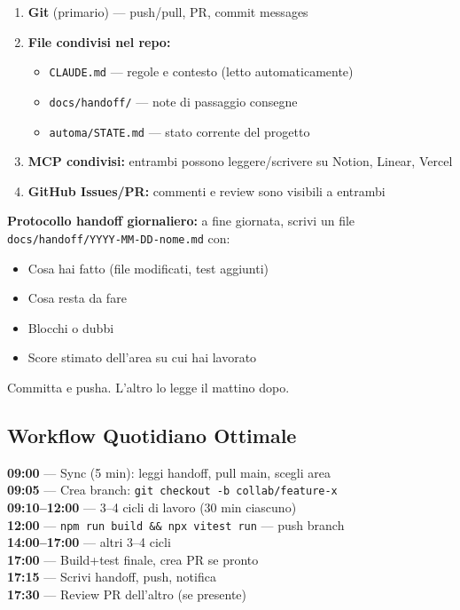 \documentclass[11pt,a4paper]{article}
\begin{document}
\begin{enumerate}[leftmargin=2em]
  \item \textbf{Git} (primario) --- push/pull, PR, commit messages
  \item \textbf{File condivisi nel repo:}
  \begin{itemize}
    \item \texttt{CLAUDE.md} --- regole e contesto (letto automaticamente)
    \item \texttt{docs/handoff/} --- note di passaggio consegne
    \item \texttt{automa/STATE.md} --- stato corrente del progetto
  \end{itemize}
  \item \textbf{MCP condivisi:} entrambi possono leggere/scrivere su Notion, Linear, Vercel
  \item \textbf{GitHub Issues/PR:} commenti e review sono visibili a entrambi
\end{enumerate}

\begin{consiglio}
\textbf{Protocollo handoff giornaliero:} a fine giornata, scrivi un file \texttt{docs/handoff/YYYY-MM-DD-nome.md} con:
\begin{itemize}[leftmargin=1.5em]
  \item Cosa hai fatto (file modificati, test aggiunti)
  \item Cosa resta da fare
  \item Blocchi o dubbi
  \item Score stimato dell'area su cui hai lavorato
\end{itemize}
Committa e pusha. L'altro lo legge il mattino dopo.
\end{consiglio}

\subsection{Workflow Quotidiano Ottimale}

\begin{tecnico}
\textbf{09:00} --- Sync (5 min): leggi handoff, pull main, scegli area\\
\textbf{09:05} --- Crea branch: \texttt{git checkout -b collab/feature-x}\\
\textbf{09:10--12:00} --- 3--4 cicli di lavoro (30 min ciascuno)\\
\textbf{12:00} --- \texttt{npm run build \&\& npx vitest run} --- push branch\\
\textbf{14:00--17:00} --- altri 3--4 cicli\\
\textbf{17:00} --- Build+test finale, crea PR se pronto\\
\textbf{17:15} --- Scrivi handoff, push, notifica\\
\textbf{17:30} --- Review PR dell'altro (se presente)
\end{tecnico}
\end{document}
